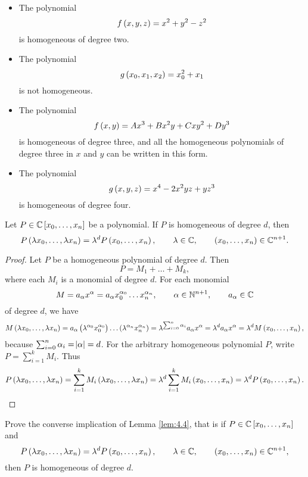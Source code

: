 \begin{example}
\hfill
\begin{itemize}
\item The polynomial
$$ f\br{x, y, z} = x^2 + y^2 - z^2 $$
is homogeneous of degree two.
\item The polynomial
$$ g\br{x_0, x_1, x_2} = x_0^2 + x_1 $$
is not homogeneous.
\item The polynomial
$$ f\br{x, y} = Ax^3 + Bx^2y + Cxy^2 + Dy^3 $$
is homogeneous of degree three, and all the homogeneous polynomials of degree three in $ x $ and $ y $ can be written in this form.
\item The polynomial
$$ g\br{x, y, z} = x^4 - 2x^2yz + yz^3 $$
is homogeneous of degree four.
\end{itemize}
\end{example}

\pagebreak

\begin{lemma}
\label{lem:4.4}
Let $ P \in \C\sbr{x_0, \dots, x_n} $ be a polynomial. If $ P $ is homogeneous of degree $ d $, then
$$ P\br{\lambda x_0, \dots, \lambda x_n} = \lambda^dP\br{x_0, \dots, x_n}, \qquad \lambda \in \C, \qquad \br{x_0, \dots, x_n} \in \C^{n + 1}. $$
\end{lemma}

\begin{proof}
Let $ P $ be a homogeneous polynomial of degree $ d $. Then
$$ P = M_1 + \dots + M_k, $$
where each $ M_i $ is a monomial of degree $ d $. For each monomial
$$ M = a_\alpha x^\alpha = a_\alpha x_0^{\alpha_0} \dots x_n^{\alpha_n}, \qquad \alpha \in \mathbb{N}^{n + 1}, \qquad a_\alpha \in \mathbb{C} $$
of degree $ d $, we have
$$ M\br{\lambda x_0, \dots, \lambda x_n} = a_\alpha\br{\lambda^{\alpha_0}x_0^{\alpha_0}} \dots \br{\lambda^{\alpha_n}x_n^{\alpha_n}} = \lambda^{\sum_{i = 0}^n \alpha_i}a_\alpha x^\alpha = \lambda^da_\alpha x^\alpha = \lambda^dM\br{x_0, \dots, x_n}, $$
because $ \sum_{i = 0}^n \alpha_i = \abs{\alpha} = d $. For the arbitrary homogeneous polynomial $ P $, write $ P = \sum_{i = 1}^k M_i $. Thus
$$ P\br{\lambda x_0, \dots, \lambda x_n} = \sum_{i = 1}^k M_i\br{\lambda x_0, \dots, \lambda x_n} = \lambda^d\sum_{i = 1}^k M_i\br{x_0, \dots, x_n} = \lambda^dP\br{x_0, \dots, x_n}. $$
\end{proof}

\begin{exercise}
Prove the converse implication of Lemma \ref{lem:4.4}, that is if $ P \in \C\sbr{x_0, \dots, x_n} $ and
$$ P\br{\lambda x_0, \dots, \lambda x_n} = \lambda^dP\br{x_0, \dots, x_n}, \qquad \lambda \in \C, \qquad \br{x_0, \dots, x_n} \in \C^{n + 1}, $$
then $ P $ is homogeneous of degree $ d $.
\end{exercise}

